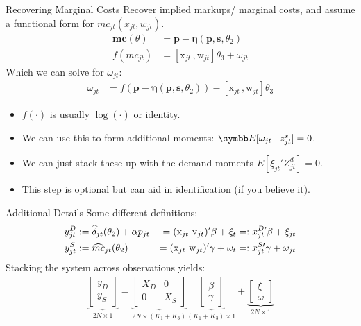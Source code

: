 \documentclass[aspectratio=169,10pt]{beamer}
\begin{document}
\begin{frame}{Recovering Marginal Costs }
Recover implied markups/ marginal costs, and assume a functional form for $mc_{jt}(x_{jt},w_{jt})$.
\begin{align*}
\symbf{mc}(\theta)&= \symbf{p}- \symbf{\eta}(\symbf{p},\symbf{s},\theta_2)\\
f(mc_{jt}) &= [\textrm{x}_{jt} \,, \textrm{w}_{jt}] \theta_3 + \omega_{jt}
\end{align*}
Which we can solve for $\omega_{jt}$:
\begin{align*}
\omega_{jt} &=  f(\symbf{p}- \symbf{\eta}(\symbf{p},\symbf{s},\theta_2) ) -[\textrm{x}_{jt} \,, \textrm{w}_{jt}] \theta_3 
\end{align*}
\begin{itemize}
\item $f(\cdot)$ is usually $\log(\cdot)$ or identity.
\item We can use this to form additional moments: $\E[\omega_{jt} \mid  z_{jt}^{s}]=0$.
\item We can just stack these up with the demand moments $E[\xi_{jt}' Z_{jt}^d]=0$.
\item This step is optional but can aid in identification (if you believe it).
\end{itemize}
\end{frame}


\begin{frame}{Additional Details}
Some different definitions:
\begin{alignat}{3}
\label{eq:stacked}
\nonumber y_{jt}^D &:= \widehat \delta_{jt}(\theta_2) + \alpha p_{jt} &=(\textrm{x}_{jt} \-\ \textrm{v}_{jt})' \beta + \xi_t &=: x_{jt}^{D\prime}\beta + \xi_{jt} \\ 
y_{jt}^S &:= \widehat{mc}_{jt}(\theta_2) &= (\textrm{x}_{jt} \-\ \textrm{w}_{jt})'\gamma + \omega_t &=: x_{jt}^{S\prime} \gamma + \omega_{jt} 
\end{alignat}
Stacking the system across observations yields:
\begin{align}
\underbrace{\begin{bmatrix} y_D \\ y_S \end{bmatrix}}_{2N\times1} = 
\underbrace{\begin{bmatrix}
X_D & 0 \\
0 & X_S 
\end{bmatrix}}_{2N\times(K_1+K_3)}
\underbrace{\begin{bmatrix}
\beta \\ \gamma %
\end{bmatrix}}_{(K_1+K_3)\times1} + 
\underbrace{\begin{bmatrix}
\xi \\ \omega %
\end{bmatrix}}_{2N\times 1}
\end{align}
\end{frame}
\end{document}
